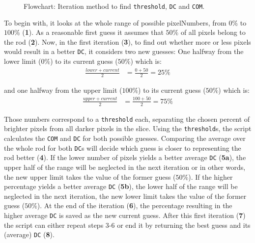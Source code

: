 \begin{figure}[p]
	\caption{Flowchart: Iteration method to find \texttt{threshold}, \texttt{DC} and \texttt{COM}.}
	\label{flo:COM-iter}
\end{figure}

To begin with, it looks at the whole range of possible pixelNumbers, from $0\%$ to $100\%$ (\textbf{1}).
As a reasonable first guess it assumes that $50\%$ of all pixels belong to the rod (\textbf{2}).
Now, in the first iteration (\textbf{3}), to find out whether more or less pixels would result in a better \texttt{DC}, it considers two new guesses:
One halfway from the lower limit ($0\%$) to its current guess ($50\%$) which is:
\begin{align}
  \frac{lower + current}{2} &= \frac{0+50}{2}=25\% 
\end{align}

and one halfway from the upper limit ($100\%$) to its current guess ($50\%$) which is:
\begin{align}
 \frac{upper + current}{2} &= \frac{100+50}{2}=75\%
\end{align}


Those numbers correspond to a \texttt{threshold} each, separating the chosen percent of brighter pixels from all darker pixels in the slice.
Using the \texttt{threshold}s, the script calculates the \texttt{COM} and \texttt{DC} for both possible guesses.
Comparing the average over the whole rod for both \texttt{DC}s will decide which guess is closer to representing the rod better (\textbf{4}).
If the lower number of pixels yields a better average \texttt{DC} (\textbf{5a}), the upper half of the range will be neglected in the next iteration or in other words, the new upper limit takes the value of the former guess ($50\%$).
If the higher percentage yields a better average \texttt{DC} (\textbf{5b}), the lower half of the range will be neglected in the next iteration, the new lower limit takes the value of the former guess ($50\%$).
At the end of the iteration (\textbf{6}), the percentage resulting in the higher average \texttt{DC} is saved as the new current guess.
After this first iteration (\textbf{7}) the script can either repeat steps 3-6 or end it by returning the best guess and its (average) \texttt{DC} (\textbf{8}).\\

